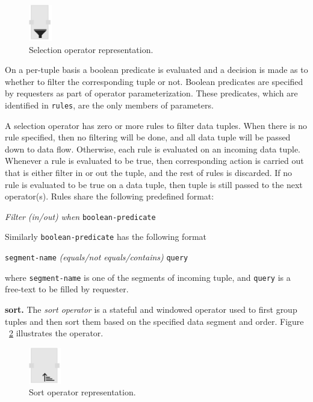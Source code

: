 \begin{figure}[ht]
	\centering
	\includegraphics[height=60px]{figures/SelectionOperator.pdf}
	\caption{Selection operator representation.}
	\label{fig:selection operator}
\end{figure}

On a per-tuple basis a boolean predicate is evaluated and a decision is made as 
to whether to filter the corresponding tuple or not. Boolean predicates are specified 
by requesters as part of operator parameterization. These predicates, which are 
identified in \texttt{rules}, are the only members of parameters.

A selection operator has zero or more rules to filter data tuples. When there is 
no rule specified, then no filtering will be done, and all data tuple will be passed 
down to data flow. Otherwise, each rule is evaluated on an incoming data tuple. 
Whenever a rule is evaluated to be true, then corresponding action is carried out 
that is either filter in or out the tuple, and the rest of rules is discarded. If no rule is 
evaluated to be true on a data tuple, then tuple is still passed to the next operator(s). 
Rules share the following predefined format:

\textit{Filter} \textit{(in/out)} \textit{when} \texttt{boolean-predicate}

Similarly \texttt{boolean-predicate} has the following format

\texttt{segment-name} \textit{(equals/not equals/contains)} \texttt{query}

where \texttt{segment-name} is one of the segments of incoming tuple, 
and \texttt{query} is a free-text to be filled by requester.

\textbf{sort.}
The \textit{sort operator} is a stateful and windowed operator used to first group 
tuples and then sort them based on the specified data segment and order. Figure
~\ref{fig:sort operator} illustrates the operator.

\begin{figure}[ht]
	\centering
	\includegraphics[height=60px]{figures/SortOperator.pdf}
	\caption{Sort operator representation.}
	\label{fig:sort operator}
\end{figure}


